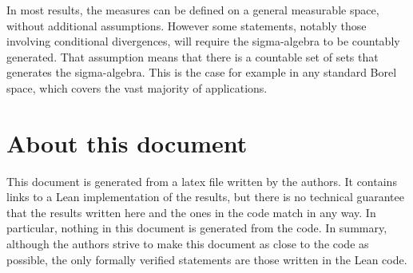 In most results, the measures can be defined on a general measurable space, without additional assumptions.
However some statements, notably those involving conditional divergences, will require the sigma-algebra to be countably generated.
That assumption means that there is a countable set of sets that generates the sigma-algebra.
This is the case for example in any standard Borel space, which covers the vast majority of applications.

\section*{About this document}

This document is generated from a latex file written by the authors. It contains links to a Lean implementation of the results, but there is no technical guarantee that the results written here and the ones in the code match in any way.
In particular, nothing in this document is generated from the code.
In summary, although the authors strive to make this document as close to the code as possible, the only formally verified statements are those written in the Lean code.
